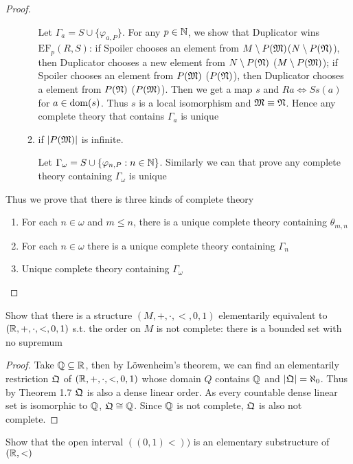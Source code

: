 \documentclass[11pt]{article}
\def \EF {\text{EF}}
\begin{document}
\begin{proof}
\begin{enumerate}
\begin{enumerate}
Let \(\Gamma_a=S\cup\{\varphi_{a,P}\}\). For any \(p\in\mathbb{N}\), we show that Duplicator wins \(\EF_p(R,S)\): if
Spoiler chooses an element from \(M\setminus P(\mathfrak{M})\)(\(N\setminus P(\mathfrak{N})\)), then Duplicator chooses a new element
from \(N\setminus P(\mathfrak{N})\) (\(M\setminus P(\mathfrak{M})\)); if Spoiler chooses an element from \(P(\mathfrak{M})\) (\(P(\mathfrak{N})\)), then
Duplicator chooses a element from \(P(\mathfrak{N})\) (\(P(\mathfrak{M})\)). Then we get a map \(s\)
and \(Ra\Leftrightarrow Ss(a)\) for \(a\in\operatorname{dom}(s)\). Thus \(s\) is a local isomorphism and \(\mathfrak{M}\equiv\mathfrak{N}\). Hence any
complete theory that contains \(\Gamma_a\) is unique
\item if \(\abs{P(\fM)}\) is infinite.

Let \(\Gamma_\omega=S\cup\{\varphi_{n,P}:n\in\mathbb{N}\}\). Similarly we can that prove any complete theory containing \(\Gamma_\omega\) is
unique
\end{enumerate}
\end{enumerate}


Thus we prove that there is three kinds of complete theory
\begin{enumerate}
\item For each \(n\in\omega\) and \(m\le n\), there is a unique complete theory containing \(\theta_{m,n}\)
\item For each \(n\in\omega\) there is a unique complete theory containing \(\Gamma_n\)
\item Unique complete theory containing \(\Gamma_\omega\)
\end{enumerate}
\end{proof}

\begin{exercise}
Show that there is a structure \((M,+,\cdot,<,0,1)\) elementarily equivalent to \((\mathbb{R},+,\cdot,<,0,1)\) s.t.
the order on \(M\) is not complete: there is a bounded set with no supremum
\end{exercise}

\begin{proof}
Take \(\mathbb{Q}\subseteq\mathbb{R}\), then by Löwenheim's theorem, we can find an elementarily restriction \(\mathfrak{Q}\)
of \((\mathbb{R},+,\cdot,<,0,1)\) whose domain \(Q\) contains \(\mathbb{Q}\) and \(\abs{\fQ}=\aleph_0\). Thus by Theorem 1.7 \(\mathfrak{Q}\) is
also a dense linear order. As every countable dense linear set is isomorphic to \(\mathbb{Q}\), \(\mathfrak{Q}\cong\mathbb{Q}\).
Since \(\mathbb{Q}\) is not complete, \(\mathfrak{Q}\) is also not complete.
\end{proof}

\begin{exercise}
Show that the open interval \(((0,1)<))\) is an elementary substructure of \((\mathbb{R},<)\)
\end{exercise}
\end{document}
